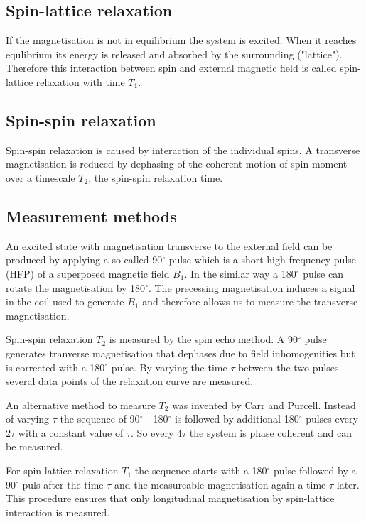 \documentclass[12pt, english]{scrartcl} %
\begin{document}
\begin{multicols}{2}
\subsection{Spin-lattice relaxation}

If the magnetisation is not in equilibrium the system is excited. When it reaches equlibrium its energy is released and absorbed by the surrounding ("lattice"). Therefore this interaction between spin and external magnetic field is called spin-lattice relaxation with time $T_1$.

\subsection{Spin-spin relaxation}

Spin-spin relaxation is caused by interaction of the individual spins. A transverse magnetisation is reduced by dephasing of the coherent motion of spin moment over a timescale $T_2$, the spin-spin relaxation time.

\subsection{Measurement methods}

An excited state with magnetisation transverse to the external field can be produced by applying a so called 90$^ \circ$ pulse which is a short high frequency pulse (HFP) of a superposed magnetic field $B_1$. In the similar way a 180$ ^\circ$ pulse can rotate the magnetisation by 180$^\circ$. The precessing magnetisation induces a signal in the coil used to generate $B_1$ and therefore allows us to measure the transverse magnetisation.

Spin-spin relaxation $T_2$ is measured by the spin echo method. A 90$^\circ$ pulse generates tranverse magnetisation that dephases due to field inhomogenities but is corrected with a 180$^\circ$ pulse. By varying the time $\tau$ between the two pulses several data points of the relaxation curve are measured.

An alternative method to measure $T_2$ was invented by Carr and Purcell. Instead of varying $\tau$ the sequence of 90$^\circ$ - 180$^\circ$ is followed by additional 180$^\circ$ pulses every $2\tau$ with a constant value of $\tau$. So every $4\tau$ the system is phase coherent and can be measured.

For spin-lattice relaxation $T_1$ the sequence starts with a 180$^\circ$ pulse followed by a 90$^\circ$ puls after the time $\tau$ and the measureable magnetisation again a time $\tau$ later. This procedure ensures that only longitudinal magnetisation by spin-lattice interaction is measured.


\end{multicols}
\end{document}
